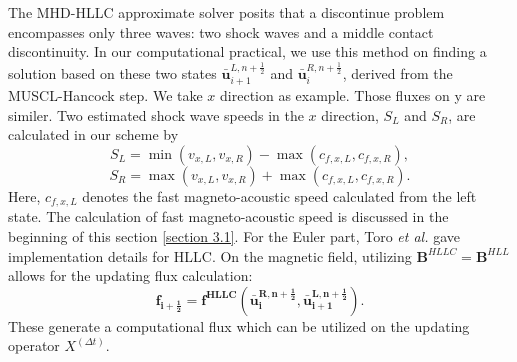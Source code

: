The MHD-HLLC approximate solver posits that a discontinue problem encompasses only three waves: two shock waves and a middle contact discontinuity. In our computational practical, we use this method on finding a solution based on these two states $\mathbf{\bar{u}}^{L,n+\frac{1}{2}}_{i+1}$ and $\mathbf{\bar{u}}^{R,n+\frac{1}{2}}_{i}$, derived from the MUSCL-Hancock step. We take $x$ direction as example. Those fluxes on y are similer. Two estimated shock wave speeds in the $x$ direction, ${{S}_{L}}$ and ${{S}_{R}}$, are calculated in our scheme by $${{S}_{L}}=\min \left(  {{v}_{x,L}} , {{v}_{x,R}}  \right)-\max \left( {{c}_{f,x,L}},{{c}_{f,x,R}} \right),$$ $${{S}_{R}}=\max \left(  {{v}_{x,L}} , {{v}_{x,R}}  \right)+\max \left( {{c}_{f,x,L}},{{c}_{f,x,R}} \right).$$ Here, ${c}_{f,x,L}$ denotes the fast magneto-acoustic speed calculated from the left state. The calculation of fast magneto-acoustic speed is discussed in the beginning of this section \ref{section 3.1}. For the Euler part, Toro \textit{et al.} \cite{toro2013riemann} gave implementation details for HLLC. On the magnetic field, utilizing $\mathbf{B}^{HLLC}=\mathbf{B}^{HLL}$ \cite{li2005hllc} allows for the updating flux calculation: $$\mathbf{f_{i+\frac{1}{2}}}=\mathbf{f^{HLLC} \left( \mathbf{\bar{u}}^{R,n+\frac{1}{2}}_{i},\mathbf{\bar{u}}^{L,n+\frac{1}{2}}_{i+1} \right) }.$$
These generate a computational flux which can be utilized on the updating operator $X^{(\Delta t)}$.
 

